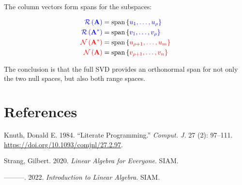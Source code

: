 \documentclass[
  letterpaper,
  DIV=11,
  numbers=noendperiod]{scrreprt}
\newlength{\cslhangindent}
\newenvironment{CSLReferences}[2] %
 {\begin{list}{}{%
  \setlength{\itemindent}{0pt}
  \setlength{\leftmargin}{0pt}
  \setlength{\parsep}{0pt}
  \ifodd #1
   \setlength{\leftmargin}{\cslhangindent}
   \setlength{\itemindent}{-1\cslhangindent}
  \fi
  \setlength{\itemsep}{#2\baselineskip}}}
 {\end{list}}
\theoremstyle{plain}
\theoremstyle{definition}
\theoremstyle{remark}
\begin{document}
\begin{tcolorbox}
The column vectors form spans for the subspaces:

\begin{align} 
\color{blue}{\mathcal{R} \left( \mathbf{A} \right)} &=
\text{span} \left\{
 \color{blue}{u_{1}}, \dots , \color{blue}{u_{\rho}}
\right\} \\
\color{blue}{\mathcal{R} \left( \mathbf{A}^{*} \right)} &=
\text{span} \left\{
 \color{blue}{v_{1}}, \dots , \color{blue}{v_{\rho}}
\right\} \\
\color{red}{\mathcal{N} \left( \mathbf{A}^{*} \right)} &=
\text{span} \left\{
\color{red}{u_{\rho+1}}, \dots , \color{red}{u_{m}}
\right\} \\
\color{red}{\mathcal{N} \left( \mathbf{A} \right)} &=
\text{span} \left\{
\color{red}{v_{\rho+1}}, \dots , \color{red}{v_{n}}
\right\} \\
%
\end{align}

The conclusion is that the full SVD provides an orthonormal span for not
only the two null spaces, but also both range spaces.

\end{tcolorbox}


\chapter*{References}\label{references}


\label{refs}
\begin{CSLReferences}{1}{0}
Knuth, Donald E. 1984. {``Literate Programming.''} \emph{Comput. J.} 27
(2): 97--111. \url{https://doi.org/10.1093/comjnl/27.2.97}.

Strang, Gilbert. 2020. \emph{Linear Algebra for Everyone}. SIAM.

---------. 2022. \emph{Introduction to Linear Algebra}. SIAM.

\end{CSLReferences}
\end{document}

